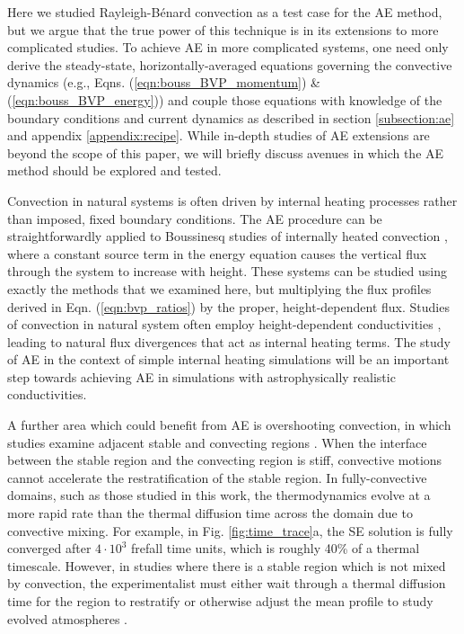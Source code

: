 \documentclass[aps, pre, onecolumn, nofootinbib, notitlepage, groupedaddress, amsfonts, amssymb, amsmath, longbibliography]{revtex4-1}
\newcommand{\RB}{Rayleigh-B\'{e}nard }
\begin{document}
Here we studied \RB convection as a test case for the AE method, but we argue that
the true power of this technique is in its extensions to more complicated studies.
To achieve AE in more complicated systems, one need only derive 
the steady-state, horizontally-averaged equations governing
the convective dynamics
(e.g., Eqns. (\ref{eqn:bouss_BVP_momentum}) \& (\ref{eqn:bouss_BVP_energy}))
and couple those equations with knowledge of the boundary conditions
and current dynamics as described in
section \ref{subsection:ae} and appendix \ref{appendix:recipe}.
While in-depth studies of AE extensions are beyond the 
scope of this paper, we will briefly discuss
avenues in which the AE method should be explored and tested.

Convection in natural systems is often driven by internal heating processes
rather than imposed, fixed boundary conditions. The AE procedure can be straightforwardly
applied to Boussinesq studies of internally heated convection \cite{goluskin2016},
where a constant source term in the energy equation causes 
the vertical flux through the system to increase with height.
These systems can be
studied using exactly the methods that we examined here, but 
multiplying the flux profiles derived
in Eqn. (\ref{eqn:bvp_ratios}) by the proper, height-dependent flux. Studies of
convection in natural system often employ height-dependent conductivities
\cite{brandenburg2016, kapyla&all2017}, leading
to natural flux divergences that act as internal heating terms.
The study
of AE in the context of simple internal heating simulations will be an important step
towards achieving AE in simulations with astrophysically realistic conductivities.

A further area which could benefit from AE is overshooting convection, in which
studies examine adjacent stable and convecting regions
\cite{hurlburt&all1986, brandenburg&all2005, couston&all2017}.
When the interface between the stable region
and the convecting region is stiff,
convective motions cannot accelerate the restratification of the stable region.
In fully-convective domains, such as those studied in this work, the thermodynamics evolve
at a more rapid rate than the thermal diffusion time across the domain due to
convective mixing.  For example, in Fig. \ref{fig:time_trace}a,
the SE solution is fully converged after $4\cdot 10^3$ frefall time units,
which is roughly 40\% of a thermal timescale. However, in 
studies where there is a stable region which is not mixed by convection, the experimentalist
must either wait through a thermal diffusion time for the region to restratify
or otherwise adjust the mean profile to study evolved atmospheres \cite{couston&all2017}.
\end{document}
